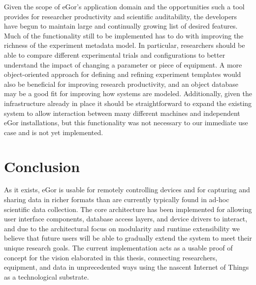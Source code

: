 \documentclass[../thesis]{subfiles}
\begin{document}
Given the scope of eGor's application domain and the opportunities
such a tool provides for researcher productivity and scientific
auditability, the developers have begun to maintain large and
continually growing list of desired features. Much of the
functionality still to be implemented has to do with improving the
richness of the experiment metadata model. In particular, researchers
should be able to compare different experimental trials and
configurations to better understand the impact of changing a parameter
or piece of equipment. A more object-oriented approach for defining
and refining experiment templates would also be beneficial for
improving research productivity, and an object database may be a good
fit for improving how systems are modeled. Additionally, given the
infrastructure already in place it should be straightforward to expand
the existing system to allow interaction between many different
machines and independent eGor installations, but this functionality
was not necessary to our immediate use case and is not yet
implemented.



\section{Conclusion}
As it exists, eGor is usable for remotely controlling devices and for
capturing and sharing data in richer formats than are currently
typically found in ad-hoc scientific data collection. The core
architecture has been implemented for allowing user interface
components, database access layers, and device drivers to interact,
and due to the architectural focus on modularity and runtime
extensibility we believe that future users will be able to gradually
extend the system to meet their unique research goals. The current
implementation acts as a usable proof of concept for the vision
elaborated in this thesis, connecting researchers, equipment,
and data in unprecedented ways using the nascent Internet of Things as
a technological substrate.
\end{document}
